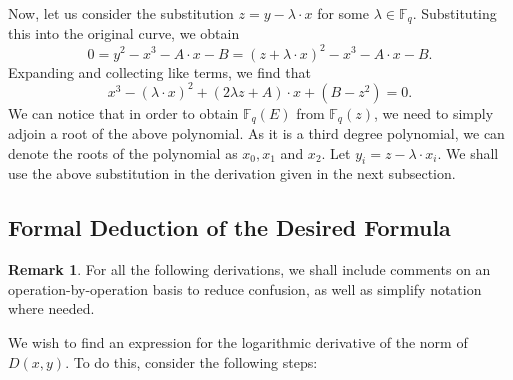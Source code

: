 \documentclass{article}
\theoremstyle{definition}
\newtheorem{remark}{Remark}
\newcommand{\6}{\mathbf}
\newcommand{\7}{\mathcal}
\begin{document}
Now, let us consider the substitution $z = y - \lambda \cdot x$ for some $\lambda \in \mathbb{F}_q$. Substituting this into the original curve, we obtain
$$0 = y^2 - x^3 - A \cdot x - B = (z + \lambda \cdot x)^2 - x^3 - A \cdot x - B.$$
Expanding and collecting like terms, we find that
$$x^3 - (\lambda \cdot x)^2 + (2 \lambda z + A) \cdot x + (B - z^2) = 0.$$
We can notice that in order to obtain $\mathbb{F}_q(E)$ from $\mathbb{F}_q(z)$, we need to simply adjoin a root of the above polynomial. As it is a third degree polynomial, we can denote the roots of the polynomial as $x_0,x_1$ and $x_2$. Let $y_i = z - \lambda \cdot x_i$. We shall use the above substitution in the derivation given in the next subsection.

\subsection{Formal Deduction of the Desired Formula}

\medskip

\begin{remark}For all the following derivations, we shall include comments on an operation-by-operation basis to reduce confusion, as well as simplify notation where needed.
\end{remark}

We wish to find an expression for the logarithmic derivative of the norm of $D(x,y)$. To do this, consider the following steps:
\end{document}
